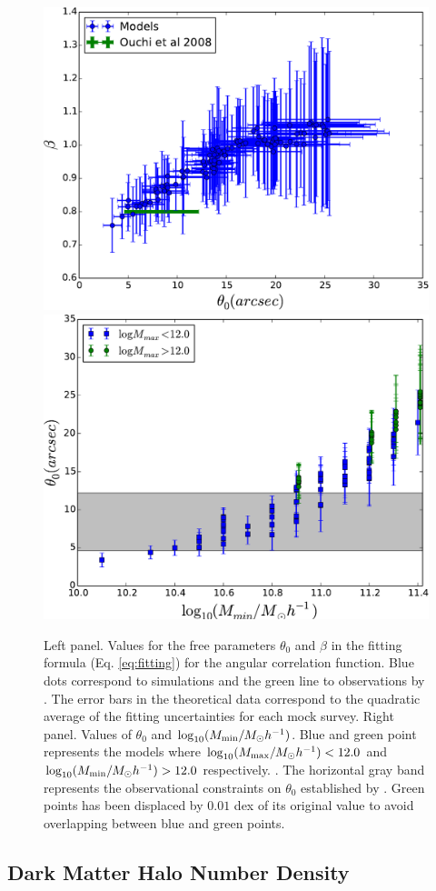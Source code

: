 \documentclass{emulateapj}
\begin{document}
\begin{figure}
\begin{center}
\includegraphics[width=0.49\linewidth,angle=0]{Fig7_corr_params.pdf}  
\includegraphics[width=0.49\linewidth,angle=0]{Fig7_mmin_vs_theta.pdf} 
\end{center}
\caption{Left panel. Values for the free parameters $\theta_{0}$ and $\beta$
in the fitting formula (Eq. \ref{eq:fitting}) for the angular
correlation function. Blue dots correspond to simulations and the
green line to observations by \citet{Ouchi2008,Ouchi2010}. The error
bars in the theoretical data correspond to the quadratic average of
the fitting uncertainties for each mock survey. Right panel. Values of
$\theta_{0}$  and $\log_{10}(M_{\rm min}/M_{\odot} h^{-1})$. Blue and
green point represents the models where  $\log_{10}(M_{\rm max}/M_{\odot}
h^{-1})<12.0$ and  $\log_{10}(M_{\rm min}/M_{\odot} h^{-1})>12.0$
respectively. .  The horizontal gray band represents the observational
constraints on $\theta_{0}$ established by
\citet{Ouchi2008,Ouchi2010}. Green points has been displaced by
$0.01$ dex of its original value to avoid overlapping between blue and
green points.} \label{fig:correlation_parameters}   
\end{figure}


\subsection{Dark Matter Halo Number Density}
\end{document}
